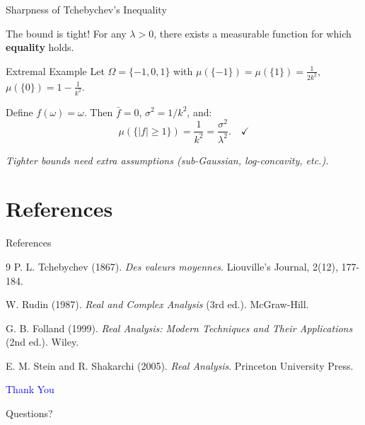 \documentclass{beamer}
\begin{document}
\begin{frame}{Sharpness of Tchebychev's Inequality}
    \begin{alertblock}{The bound is tight!}
        For any $\lambda > 0$, there exists a measurable function for which \textbf{equality} holds.
    \end{alertblock}

    \vspace{0.2cm}
    \begin{exampleblock}{Extremal Example}
        Let $\Omega = \{-1, 0, 1\}$ with $\mu(\{-1\}) = \mu(\{1\}) = \frac{1}{2k^2}$, \ $\mu(\{0\}) = 1 - \frac{1}{k^2}$.

        \vspace{0.2cm}
        Define $f(\omega) = \omega$. Then $\bar{f} = 0$, $\sigma^2 = 1/k^2$, and:
        \[
            \mu(\{|f| \geq 1\}) = \frac{1}{k^2} = \frac{\sigma^2}{\lambda^2}. \quad \checkmark
        \]
    \end{exampleblock}

    \vspace{0.2cm}
    \textit{Tighter bounds need extra assumptions (sub-Gaussian, log-concavity, etc.).}
\end{frame}

\section{References}

\begin{frame}{References}
    \begin{thebibliography}{9}
            P. L. Tchebychev (1867).
            \newblock \emph{Des valeurs moyennes}.
            \newblock Liouville's Journal, 2(12), 177-184.

            W. Rudin (1987).
            \newblock \emph{Real and Complex Analysis} (3rd ed.).
            \newblock McGraw-Hill.

            G. B. Folland (1999).
            \newblock \emph{Real Analysis: Modern Techniques and Their Applications} (2nd ed.).
            \newblock Wiley.

            E. M. Stein and R. Shakarchi (2005).
            \newblock \emph{Real Analysis}.
            \newblock Princeton University Press.
    \end{thebibliography}
\end{frame}

\begin{frame}{}
    \begin{center}
        \Huge \textcolor{blue}{Thank You}

        \vspace{0.5cm}

        \vspace{0.5cm}
        \normalsize Questions?
    \end{center}
\end{frame}
\end{document}
